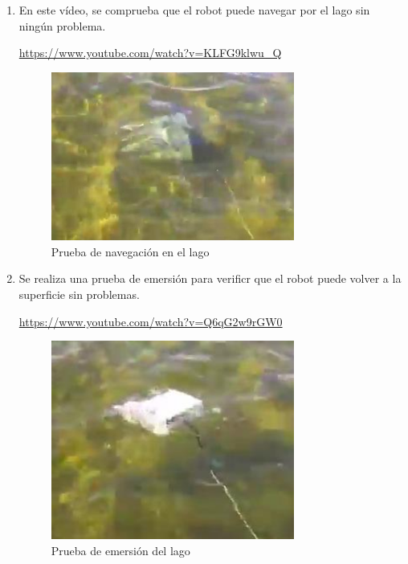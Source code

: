 \begin{enumerate}
\item En este vídeo, se comprueba que el robot puede navegar por el lago sin ningún problema.
\begin{center}
\url{https://www.youtube.com/watch?v=KLFG9klwu_Q}
\end{center}

 \begin{figure} [hbtp]
  \begin{center}
    \includegraphics[width=8cm]{img/cap5/navegacion}
  \end{center}
  \caption{Prueba de navegación en el lago}
  \label{fig:navegacion}
 \end{figure}

\newpage
\item Se realiza una prueba de emersión para verificr que el robot puede volver a la superficie sin problemas.
\begin{center}
\url{https://www.youtube.com/watch?v=Q6qG2w9rGW0}
\end{center}

 \begin{figure} [hbtp]
  \begin{center}
    \includegraphics[width=8cm]{img/cap5/emersion}
  \end{center}
  \caption{Prueba de emersión del lago}
  \label{fig:emersion}
 \end{figure}


\end{enumerate}
